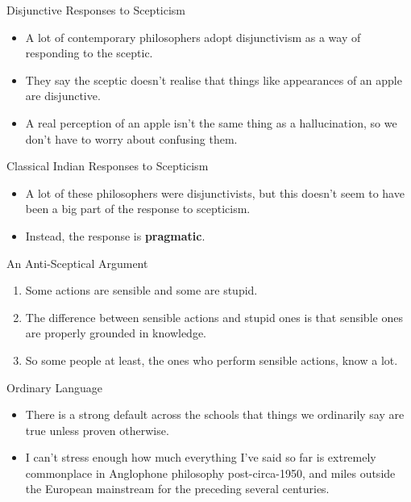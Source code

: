 \documentclass[
  17pt,
  letterpaper,
  ignorenonframetext,
  aspectratio=169,
]{beamer}
\providecommand{\tightlist}{%
  \setlength{\itemsep}{0pt}\setlength{\parskip}{0pt}}\usepackage{longtable,booktabs,array}
\begin{document}
\begin{frame}{Disjunctive Responses to Scepticism}
\protect\hypertarget{disjunctive-responses-to-scepticism}{}
\begin{itemize}[<+->]
\tightlist
\item
  A lot of contemporary philosophers adopt disjunctivism as a way of
  responding to the sceptic.
\item
  They say the sceptic doesn't realise that things like appearances of
  an apple are disjunctive.
\item
  A real perception of an apple isn't the same thing as a hallucination,
  so we don't have to worry about confusing them.
\end{itemize}
\end{frame}

\begin{frame}{Classical Indian Responses to Scepticism}
\protect\hypertarget{classical-indian-responses-to-scepticism}{}
\begin{itemize}[<+->]
\tightlist
\item
  A lot of these philosophers were disjunctivists, but this doesn't seem
  to have been a big part of the response to scepticism.
\item
  Instead, the response is \textbf{pragmatic}.
\end{itemize}
\end{frame}

\begin{frame}{An Anti-Sceptical Argument}
\protect\hypertarget{an-anti-sceptical-argument}{}
\begin{enumerate}[<+->]
\tightlist
\item
  Some actions are sensible and some are stupid.
\item
  The difference between sensible actions and stupid ones is that
  sensible ones are properly grounded in knowledge.
\item
  So some people at least, the ones who perform sensible actions, know a
  lot.
\end{enumerate}
\end{frame}

\begin{frame}{Ordinary Language}
\protect\hypertarget{ordinary-language}{}
\begin{itemize}[<+->]
\tightlist
\item
  There is a strong default across the schools that things we ordinarily
  say are true unless proven otherwise.
\item
  I can't stress enough how much everything I've said so far is
  extremely commonplace in Anglophone philosophy post-circa-1950, and
  miles outside the European mainstream for the preceding several
  centuries.
\end{itemize}
\end{frame}
\end{document}
